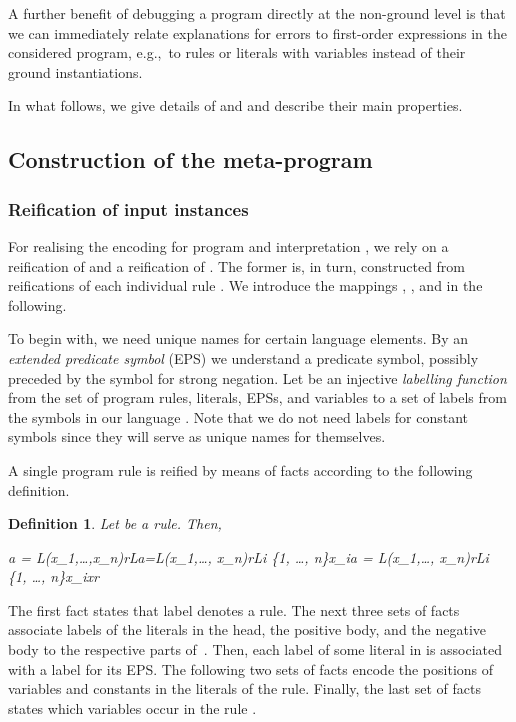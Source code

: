 \documentclass{tlp}
\newcommand{\egc}{e.g.,\ }
\newtheorem{definition}{Definition}
\begin{document}
A further benefit of debugging a program  directly at the non-ground level is that we can immediately 
relate explanations for errors to first-order expressions in  the considered program,
\egc to rules or literals with variables instead
of their ground instantiations.

In what follows, we give details of  and  and describe their main properties.

\subsection{Construction of the meta-program}
\subsubsection{Reification of input instances}
For realising the encoding  for program  and interpretation ,
we rely on a reification  of  and a reification  of .
The former is, in turn, constructed from reifications  of each individual rule .
We introduce the mappings , , and  in the following.

To begin with, we need unique names for certain language elements.
By an \emph{extended predicate symbol} (EPS) we understand a predicate symbol, possibly preceded by  
the symbol for strong negation.
Let 
 be an injective \emph{labelling function} from the set of program rules, literals, EPSs, and variables to a set of labels
from the symbols in our language . 
Note that we do not need labels for constant symbols since they will serve as unique names for themselves.

A single program rule  is reified by means of facts according to the following definition.
\begin{definition}
Let   be a rule. Then,
\begin{center}

a = L(x_{1},\ldots,x_{n})rLa\!=\!L(x_{1},\ldots, x_{n})rLi \in \{1, \ldots, n\}x_{i}a = L(x_{1},\ldots, x_{n})rLi \in \{1, \ldots, n\}x_{i}xr
\end{center}
\end{definition}
The first fact states that label  denotes a rule.
The next three sets of facts associate labels of the literals in the head, the positive body, and the negative body
to the respective parts of~.
Then, each label of some literal in  is associated with a label for its  EPS.
The following two sets of facts encode the positions of variables and constants in the literals of the rule.
Finally, the last set of facts states which variables occur in the rule .
\end{document}
